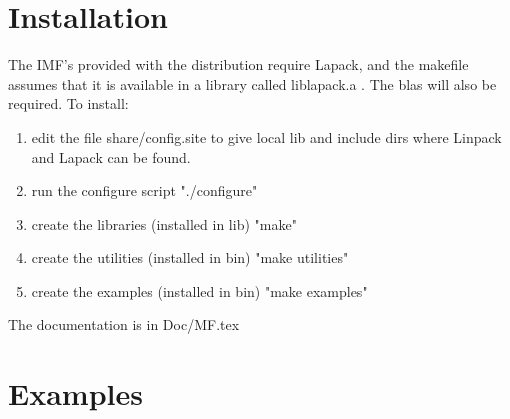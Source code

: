 \documentclass[12pt]{article}
\begin{document}
\section{Installation}

The IMF's provided with the distribution require Lapack, and the
makefile assumes  that it is available in a library called liblapack.a .
The blas will also be required. To install:
\begin{enumerate}
\item edit the file share/config.site to give local lib and include dirs where Linpack and Lapack can be found.
\item run the configure script "./configure"
\item create the libraries (installed in lib) "make"
\item create the utilities (installed in bin) "make utilities"
\item create the examples (installed in bin) "make examples"
\end{enumerate}

The documentation is in Doc/MF.tex

\section{Examples}
\end{document}
